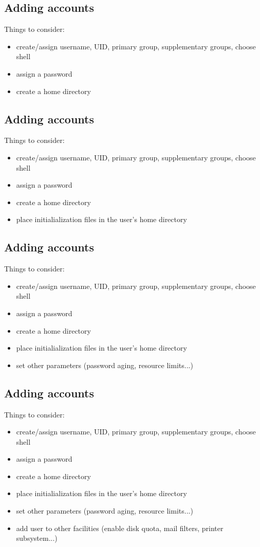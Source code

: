 \documentclass[xga]{xdvislides}
\begin{document}
\subsection{Adding accounts}
Things to consider:
\begin{itemize}
	\item create/assign username, UID, primary group, supplementary groups,
		choose shell
	\item assign a password
	\item create a home directory
\end{itemize}

\subsection{Adding accounts}
Things to consider:
\begin{itemize}
	\item create/assign username, UID, primary group, supplementary groups,
		choose shell
	\item assign a password
	\item create a home directory
	\item place initialialization files in the user's home directory
\end{itemize}

\subsection{Adding accounts}
Things to consider:
\begin{itemize}
	\item create/assign username, UID, primary group, supplementary groups,
		choose shell
	\item assign a password
	\item create a home directory
	\item place initialialization files in the user's home directory
	\item set other parameters (password aging, resource limits...)
\end{itemize}

\subsection{Adding accounts}
Things to consider:
\begin{itemize}
	\item create/assign username, UID, primary group, supplementary groups,
		choose shell
	\item assign a password
	\item create a home directory
	\item place initialialization files in the user's home directory
	\item set other parameters (password aging, resource limits...)
	\item add user to other facilities (enable disk quota, mail filters,
		printer subsystem...)
\end{itemize}
\end{document}
